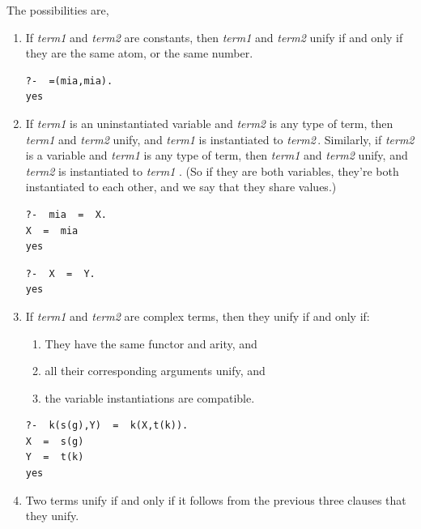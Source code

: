 \documentclass[thesis-solanki.tex]{subfiles}
\providecommand\metaSyntacticVariable[1]{\textsl{\ttfamily #1}}
\providecommand\mSV{\metaSyntacticVariable}
\begin{document}
The possibilities are,
\begin{enumerate}
\item If \mSV{term1} and \mSV{term2} are constants, then \mSV{term1} and \mSV{term2} unify if and only if they
  are the same atom, or the same number.
\begin{code-list}[h]
\begin{verbatim}
?-  =(mia,mia).
yes
\end{verbatim}
\end{code-list}

\item If \mSV{term1} is an uninstantiated variable and \mSV{term2} is any type of term, then \mSV{term1}
  and \mSV{term2} unify, and \mSV{term1} is instantiated to \mSV{term2}\,.
  Similarly, if \mSV{term2} is a variable and \mSV{term1} is any type of term, then \mSV{term1} and \mSV{term2}
  unify, and \mSV{term2} is instantiated to \mSV{term1} . (So if they are both 
variables, they’re both instantiated to each other, and we say that they share values.)
\begin{code-list}[h]
\begin{verbatim}
?-  mia  =  X.
X  =  mia
yes
\end{verbatim}

\begin{verbatim}
?-  X  =  Y.
yes
\end{verbatim}
\end{code-list}

\item If \mSV{term1} and \mSV{term2} are complex terms, then they unify if and only if:

\begin{enumerate}
\item They have the same functor and arity, and

\item all their corresponding arguments unify, and

\item the variable instantiations are compatible.
\end{enumerate}
\begin{code-list}[h]

\begin{verbatim}
?-  k(s(g),Y)  =  k(X,t(k)).
X  =  s(g)
Y  =  t(k)
yes
\end{verbatim}
\end{code-list}


\item Two terms unify if and only if it follows from the previous three clauses that they unify.
\end{enumerate}
\end{document}
